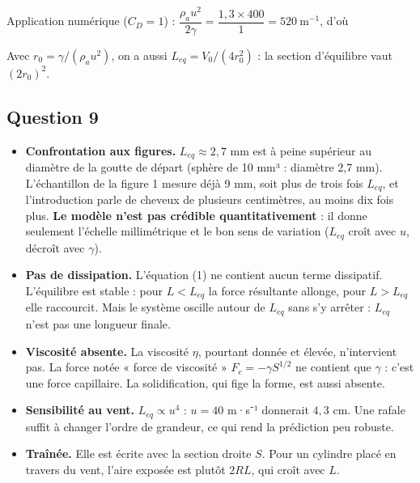 \documentclass[11pt,a4paper]{article}
\providecommand{\tightlist}{\setlength{\itemsep}{0pt}\setlength{\parskip}{0pt}}
\newcommand{\equationajustee}[1]{%
  \sbox{\boiteequation}{$\displaystyle #1$}%
  \ifdim\wd\boiteequation>\linewidth
    \[\resizebox{\linewidth}{!}{\usebox{\boiteequation}}\]%
  \else
    \[#1\]%
  \fi}
\begin{document}
Application numérique (\(C_D = 1\)) : \(\dfrac{\rho_a u^2}{2\gamma} = \dfrac{1{,}3\times400}{1} = 520\ \mathrm{m^{-1}}\), d'où

\equationajustee{L_{eq} = 1{,}0\times10^{-8}\times 520^2\ \mathrm{m}}

\equationajustee{\boxed{L_{eq} \approx 2{,}7\times10^{-3}\ \mathrm{m} = 2{,}7\ \mathrm{mm}}}

Avec \(r_0 = \gamma/(\rho_a u^2)\), on a aussi \(L_{eq} = V_0/(4r_0^2)\) : la section d'équilibre vaut \((2r_0)^2\).

\hypertarget{question-9}{%
\subsection{Question 9}\label{question-9}}

\begin{itemize}
\tightlist
\item
  \textbf{Confrontation aux figures.} \(L_{eq} \approx 2{,}7\) mm est à peine supérieur au diamètre de la goutte de départ (sphère de 10 mm³ : diamètre 2,7 mm). L'échantillon de la figure 1 mesure déjà 9 mm, soit plus de trois fois \(L_{eq}\), et l'introduction parle de cheveux de plusieurs centimètres, au moins dix fois plus. \textbf{Le modèle n'est pas crédible quantitativement} : il donne seulement l'échelle millimétrique et le bon sens de variation (\(L_{eq}\) croît avec \(u\), décroît avec \(\gamma\)).
\item
  \textbf{Pas de dissipation.} L'équation (1) ne contient aucun terme dissipatif. L'équilibre est stable : pour \(L < L_{eq}\) la force résultante allonge, pour \(L > L_{eq}\) elle raccourcit. Mais le système oscille autour de \(L_{eq}\) sans s'y arrêter : \(L_{eq}\) n'est pas une longueur finale.
\item
  \textbf{Viscosité absente.} La viscosité \(\eta\), pourtant donnée et élevée, n'intervient pas. La force notée « force de viscosité » \(F_c = -\gamma S^{1/2}\) ne contient que \(\gamma\) : c'est une force capillaire. La solidification, qui fige la forme, est aussi absente.
\item
  \textbf{Sensibilité au vent.} \(L_{eq} \propto u^4\) : \(u = 40\) m·s⁻¹ donnerait \(4{,}3\) cm. Une rafale suffit à changer l'ordre de grandeur, ce qui rend la prédiction peu robuste.
\item
  \textbf{Traînée.} Elle est écrite avec la section droite \(S\). Pour un cylindre placé en travers du vent, l'aire exposée est plutôt \(2RL\), qui croît avec \(L\).
\end{itemize}
\end{document}
